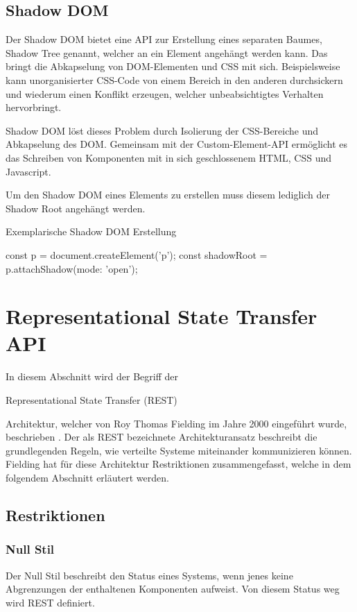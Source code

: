 \subsection{Shadow DOM}
Der Shadow DOM bietet eine API zur Erstellung eines separaten Baumes, Shadow Tree genannt, welcher an ein Element angehängt werden kann.
Das bringt die Abkapselung von DOM-Elementen und CSS mit sich. Beispielsweise kann unorganisierter CSS-Code von einem Bereich in den anderen durchsickern und wiederum einen Konflikt erzeugen, welcher unbeabsichtigtes Verhalten hervorbringt. 

Shadow DOM löst dieses Problem durch Isolierung der CSS-Bereiche und Abkapselung des DOM. 
Gemeinsam mit der Custom-Element-API ermöglicht es das Schreiben von Komponenten mit in sich geschlossenem HTML, CSS und Javascript.

Um den Shadow DOM eines Elements zu erstellen muss diesem lediglich der Shadow Root angehängt werden.
\begin{program}[!htbp]
\caption{Exemplarische Shadow DOM Erstellung}
\label{prog:shadow-dom}
\begin{JsCode}
const p = document.createElement('p');
const shadowRoot = p.attachShadow({mode: 'open'});
\end{JsCode}
\end{program}

\section{Representational State Transfer  API}
In diesem Abschnitt wird der Begriff der \begin{english}
Representational State Transfer (REST)
\end{english} Architektur, welcher von Roy Thomas Fielding im Jahre 2000 eingeführt wurde, beschrieben \cite{rest}.
Der als REST bezeichnete Architekturansatz beschreibt die grundlegenden Regeln, wie verteilte Systeme miteinander kommunizieren können.
Fielding hat für diese Architektur Restriktionen zusammengefasst, welche in dem folgendem Abschnitt erläutert werden.
\subsection{Restriktionen}
\subsubsection{Null Stil}
Der Null Stil beschreibt den Status eines Systems, wenn jenes keine Abgrenzungen der enthaltenen Komponenten aufweist. Von diesem Status weg wird REST definiert. 
